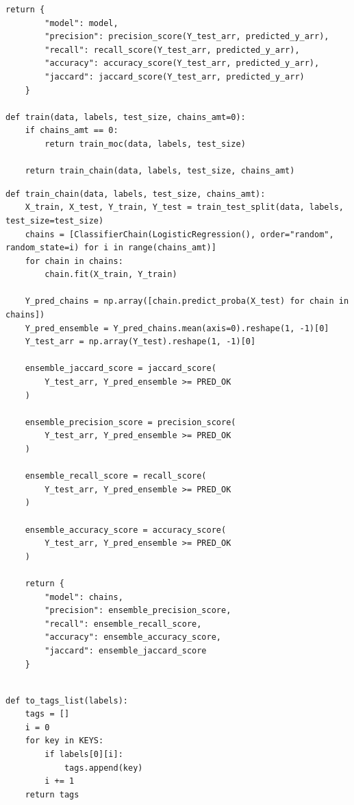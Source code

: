 \documentclass[a4paper, 12pt]{article}
\begin{document}
\begin{large}
\begin{lstlisting}[caption={Обучение независимых классификаторов}]
    return {
        "model": model,
        "precision": precision_score(Y_test_arr, predicted_y_arr),
        "recall": recall_score(Y_test_arr, predicted_y_arr),
        "accuracy": accuracy_score(Y_test_arr, predicted_y_arr),
        "jaccard": jaccard_score(Y_test_arr, predicted_y_arr)
    }

def train(data, labels, test_size, chains_amt=0):
    if chains_amt == 0:
        return train_moc(data, labels, test_size)

    return train_chain(data, labels, test_size, chains_amt)
\end{lstlisting}
\newpage
\begin{lstlisting}[caption={Обучение цепочки классификаторов}]
    def train_chain(data, labels, test_size, chains_amt):
    X_train, X_test, Y_train, Y_test = train_test_split(data, labels, test_size=test_size)
    chains = [ClassifierChain(LogisticRegression(), order="random", random_state=i) for i in range(chains_amt)]
    for chain in chains:
        chain.fit(X_train, Y_train)

    Y_pred_chains = np.array([chain.predict_proba(X_test) for chain in chains])
    Y_pred_ensemble = Y_pred_chains.mean(axis=0).reshape(1, -1)[0]
    Y_test_arr = np.array(Y_test).reshape(1, -1)[0]

    ensemble_jaccard_score = jaccard_score(
        Y_test_arr, Y_pred_ensemble >= PRED_OK
    )

    ensemble_precision_score = precision_score(
        Y_test_arr, Y_pred_ensemble >= PRED_OK
    )

    ensemble_recall_score = recall_score(
        Y_test_arr, Y_pred_ensemble >= PRED_OK
    )

    ensemble_accuracy_score = accuracy_score(
        Y_test_arr, Y_pred_ensemble >= PRED_OK
    )

    return {
        "model": chains,
        "precision": ensemble_precision_score,
        "recall": ensemble_recall_score,
        "accuracy": ensemble_accuracy_score,
        "jaccard": ensemble_jaccard_score
    }
    
\end{lstlisting}
    
\begin{lstlisting}[caption={Применение моделей}]
def to_tags_list(labels):
    tags = []
    i = 0
    for key in KEYS:
        if labels[0][i]:
            tags.append(key)
        i += 1
    return tags
\end{lstlisting}
    

\end{large}
\end{document}
